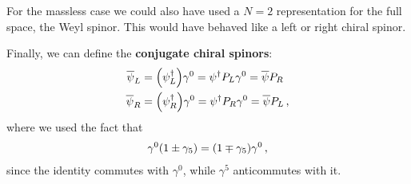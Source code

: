 \documentclass[main.tex]{subfiles}
\begin{document}
For the massless case we could also have used a \(N=2\) representation for the full space, the Weyl spinor. This would have behaved like a left or right chiral spinor.

Finally, we can define the \textbf{conjugate chiral spinors}: 
%
\begin{subequations}
\begin{align}
\overline{\psi}_{L} &= \qty(\psi_{L} ^\dag) \gamma^{0} 
= \psi ^\dag P_L \gamma^{0} = \overline{\psi} P_R \\
\overline{\psi}_{R} &= \qty(\psi_{R} ^\dag) \gamma^{0} 
= \psi ^\dag P_R \gamma^{0} = \overline{\psi} P_L 
\,,
\end{align}
\end{subequations}
%
where we used the fact that 
%
\begin{align}
\gamma^{0} \qty(1 \pm \gamma_5 ) 
= \qty(1 \mp \gamma_5 ) \gamma^{0}
\,,
\end{align}
%
since the identity commutes with \(\gamma^{0}\), while \(\gamma^{5}\) anticommutes with it.
\end{document}
